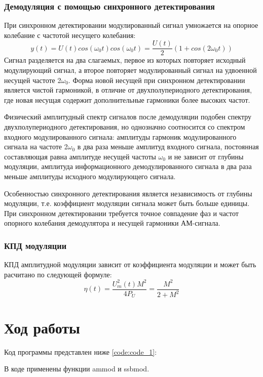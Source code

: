 \subsubsection{Демодуляция с помощью синхронного детектирования}
При синхронном детектировании модулированный сигнал умножается на опорное колебание с частотой несущего колебания:
 \begin{equation}
	y(t) = U(t) cos(\omega_0 t) cos(\omega_0 t) = \frac{U(t)}{2} (1 + cos(2\omega_0 t))
\end{equation}
Сигнал разделяется на два слагаемых, первое из которых повторяет исходный модулирующий сигнал, а второе повторяет модулированный сигнал на удвоенной несущей частоте 2$\omega_0$. Форма новой несущей при синхронном детектировании является чистой гармоникой, в отличие от двухполупериодного детектирования, где новая несущая содержит дополнительные гармоники более высоких частот. 

Физический амплитудный спектр сигналов после демодуляции подобен спектру двухполупериодного детектирования, но однозначно соотносится со спектром входного модулированного сигнала: амплитуды гармоник модулированного сигнала на частоте 2$\omega_0$ в два раза меньше амплитуд входного сигнала, постоянная составляющая равна амплитуде несущей частоты $\omega_0$ и не зависит от глубины модуляции, амплитуда информационного демодулированного сигнала в два раза меньше амплитуды исходного модулирующего сигнала. 

Особенностью синхронного детектирования является независимость от глубины модуляции, т.е. коэффициент модуляции сигнала может быть больше единицы. При синхронном детектировании требуется точное совпадение фаз и частот опорного колебания демодулятора и несущей гармоники АМ-сигнала.

\subsubsection{КПД модуляции}
КПД амплитудной модуляции зависит от коэффициента модуляции и может быть расчитано по следующей формуле:
 \begin{equation}
	\eta (t) =\frac{ U_m^2(t) M^2}{4 P_U}  = \frac{M^2}{2 + M^2} 
\end{equation}



\section{Ход работы}
Код программы представлен ниже \ref{code:code_1}:

В коде применены функции ammod и ssbmod.

